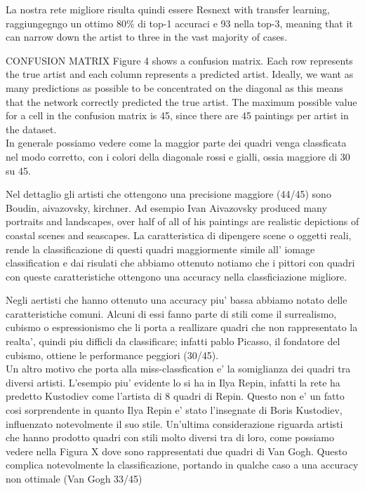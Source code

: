 \documentclass{article}
\begin{document}
La nostra rete migliore risulta quindi essere Resnext with transfer learning, raggiungegngo un ottimo 80\% di top-1 accuraci e 93 nella top-3, meaning that it can narrow down the artist to three in the vast majority
of cases. 


CONFUSION MATRIX 
Figure 4 shows a confusion matrix. Each row represents the true artist and each column represents a predicted artist. Ideally, we want as many predictions as possible to be concentrated on the diagonal as this means that the network correctly predicted the true artist. The maximum possible value for a cell in the confusion matrix is 45, since there are 45 paintings per artist in the dataset.\\
In generale possiamo vedere come la maggior parte dei quadri venga classficata nel modo corretto, con i colori della diagonale rossi e gialli, ossia maggiore di 30 su 45. 

Nel dettaglio gli artisti che ottengono una precisione maggiore (44/45) sono Boudin, aivazovsky, kirchner. Ad esempio Ivan Aivazovsky produced many portraits and landscapes, over half of all of his paintings are realistic depictions of coastal scenes and seascapes. La caratteristica di dipengere scene o oggetti reali, rende la classificazione di questi quadri maggiormente simile all' iomage classification e dai risulati che abbiamo ottenuto notiamo che i pittori con quadri con queste caratteristiche ottengono una accuracy nella classficiazione migliore.

Negli aertisti che hanno ottenuto una accuracy piu' bassa abbiamo notato delle caratteristiche comuni. Alcuni di essi fanno parte di stili come il surrealismo, cubismo o espressionismo che li porta a reallizare quadri che non rappresentato la realta', quindi piu difficli da classificare; infatti pablo Picasso, il fondatore del cubismo, ottiene le performance peggiori (30/45). \\
Un altro motivo che porta alla miss-classfication e' la somiglianza dei quadri tra diversi artisti. L'esempio piu' evidente lo si ha in Ilya Repin, infatti la rete ha predetto Kustodiev come l'artista di 8 quadri di Repin. Questo non e' un fatto cosi sorprendente in quanto Ilya Repin e' stato l'insegnate di Boris Kustodiev, influenzato notevolmente il suo stile.
Un'ultima considerazione riguarda artisti che hanno prodotto quadri con stili molto diversi tra di loro, come possiamo vedere nella Figura X dove sono rappresentati due quadri di Van Gogh. Questo complica notevolmente la classificazione, portando in qualche caso a una accuracy non ottimale (Van Gogh 33/45)
\end{document}
